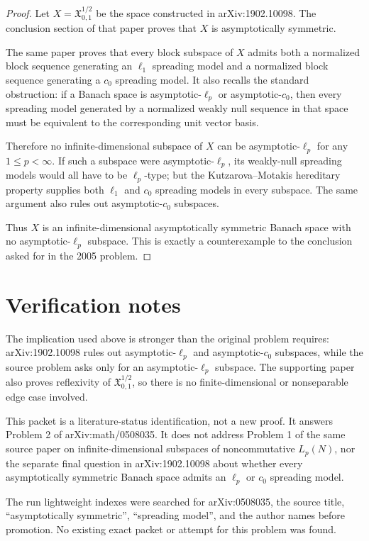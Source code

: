 \documentclass[11pt]{article}
\newcommand{\ellp}{\ell_p}
\newcommand{\cnull}{c_0}
\newcommand{\Xkm}{\mathfrak{X}^{1/2}_{0,1}}
\begin{document}
\begin{proof}
Let \(X=\Xkm\) be the space constructed in arXiv:1902.10098.  The conclusion
section of that paper proves that \(X\) is asymptotically symmetric.

The same paper proves that every block subspace of \(X\) admits both a
normalized block sequence generating an \(\ell_1\) spreading model and a
normalized block sequence generating a \(\cnull\) spreading model.  It also
recalls the standard obstruction: if a Banach space is asymptotic-\(\ellp\)
or asymptotic-\(\cnull\), then every spreading model generated by a normalized
weakly null sequence in that space must be equivalent to the corresponding
unit vector basis.

Therefore no infinite-dimensional subspace of \(X\) can be
asymptotic-\(\ellp\) for any \(1\le p<\infty\).  If such a subspace were
asymptotic-\(\ellp\), its weakly-null spreading models would all have to be
\(\ellp\)-type; but the Kutzarova--Motakis hereditary property supplies both
\(\ell_1\) and \(\cnull\) spreading models in every subspace.  The same
argument also rules out asymptotic-\(\cnull\) subspaces.

Thus \(X\) is an infinite-dimensional asymptotically symmetric Banach space
with no asymptotic-\(\ellp\) subspace.  This is exactly a counterexample to
the conclusion asked for in the 2005 problem.
\end{proof}

\section*{Verification notes}

The implication used above is stronger than the original problem requires:
arXiv:1902.10098 rules out asymptotic-\(\ellp\) and asymptotic-\(\cnull\)
subspaces, while the source problem asks only for an asymptotic-\(\ellp\)
subspace.  The supporting paper also proves reflexivity of \(\Xkm\), so there
is no finite-dimensional or nonseparable edge case involved.

This packet is a literature-status identification, not a new proof.  It
answers Problem 2 of arXiv:math/0508035.  It does not address Problem 1 of the
same source paper on infinite-dimensional subspaces of noncommutative
\(L_p(N)\), nor the separate final question in arXiv:1902.10098 about whether
every asymptotically symmetric Banach space admits an \(\ellp\) or \(\cnull\)
spreading model.

The run lightweight indexes were searched for arXiv:0508035, the source title,
``asymptotically symmetric'', ``spreading model'', and the author names before
promotion.  No existing exact packet or attempt for this problem was found.
\end{document}
